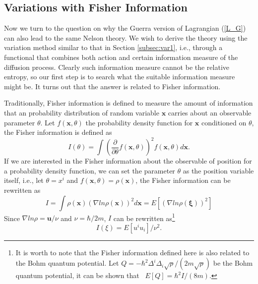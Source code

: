\documentclass[%
 aip, 
 amsmath,amssymb,amsthm,
 nofootinbib,
 reprint,
]{revtex4-1}
\begin{document}
\subsection{Variations with Fisher Information}
\label{subsec:var2}
Now we turn to the question on why the Guerra version of Lagrangian (\ref{L_G}) can also lead to the same Nelson theory. We wish to derive the theory using the variation method similar to that in Section \ref{subsec:var1}, i.e., through a functional that combines both action and certain information measure of the diffusion process. Clearly such information measure cannot be the relative entropy, so our first step is to search what the suitable information measure might be. It turns out that the answer is related to Fisher information.

Traditionally, Fisher information is defined to measure the amount of information that an probability distribution of random variable $\mathbf{x}$ carries about an observable parameter $\theta$. Let $f(\mathbf{x}, \theta)$ the probability density function for $\mathbf{x}$ conditioned on $\theta$, the Fisher information is defined as~\cite{Frieden}
\begin{equation}
    \label{Fisher}
    I(\theta) = \int (\frac{\partial}{\partial\theta}f(\mathbf{x}, \theta))^2f(\mathbf{x}, \theta) d\mathbf{x}.
\end{equation}
If we are interested in the Fisher information about the observable of position for a probability density function, we can set the parameter $\theta$ as the position variable itself, i.e., let $\theta=x^i$ and $f(\mathbf{x}, \theta)=\rho(\mathbf{x})$, the Fisher information can be rewritten as~\cite{Reginatto, Parwani}
\begin{equation}
    \label{FI}
    I = \int \rho(\mathbf{x})(\nabla ln\rho(\mathbf{x}))^2 d\mathbf{x} = E[(\nabla ln\rho(\mathbf{\xi}))^2]
\end{equation}
Since $\nabla ln\rho = \mathbf{u}/\nu$ and $\nu=\hbar/2m$, $I$ can be rewritten as\footnote{It is worth to note that the Fisher information defined here is also related to the Bohm quantum potential. Let $Q=-\hbar^2\Delta^i\Delta_i\sqrt{\rho}/(2m\sqrt{\rho})$ be the Bohm quantum potential, it can be shown that~\cite{Carroll} $E[Q]=\hbar^2 I/(8m)$. }
\begin{equation}
    \label{FI2}
    I(\mathbb{\xi})= E[u^iu_i]/\nu^2.
\end{equation}
\end{document}
